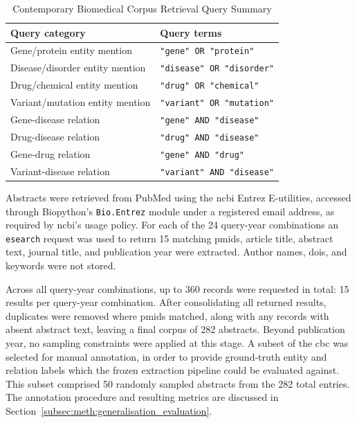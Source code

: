 \begin{table}[H]
    \centering
    \caption{Contemporary Biomedical Corpus Retrieval Query Summary}
    \label{tab:contemporary_corpus_query_summary}
    \begin{tabularx}{\textwidth}{l l}
        \toprule
        Query category & Query terms \\
        \midrule
        Gene/protein entity mention & \verb|"gene" OR "protein"| \\
        Disease/disorder entity mention & \verb|"disease" OR "disorder"| \\
        Drug/chemical entity mention & \verb|"drug" OR "chemical"| \\
        Variant/mutation entity mention & \verb|"variant" OR "mutation"| \\
        Gene-disease relation & \verb|"gene" AND "disease"| \\
        Drug-disease relation & \verb|"drug" AND "disease"| \\
        Gene-drug relation & \verb|"gene" AND "drug"| \\
        Variant-disease relation & \verb|"variant" AND "disease"| \\
        \bottomrule
    \end{tabularx}
\end{table}

Abstracts were retrieved from PubMed using the \gls{ncbi} Entrez E-utilities, accessed through Biopython's \verb|Bio.Entrez| module under a registered email address, as required by \gls{ncbi}'s usage policy. For each of the 24 query-year combinations an \verb|esearch| request was used to return 15 matching \glspl{pmid}, article title, abstract text, journal title, and publication year were extracted. Author names, \glspl{doi}, and keywords were not stored.

Across all query-year combinations, up to 360 records were requested in total: 15 results per query-year combination. After consolidating all returned results, duplicates were removed where \glspl{pmid} matched, along with any records with absent abstract text, leaving a final corpus of 282 abstracts. Beyond publication year, no sampling constraints were applied at this stage. A subset of the \gls{cbc} was selected for manual annotation, in order to provide ground-truth entity and relation labels which the frozen extraction pipeline could be evaluated against. This subset comprised 50 randomly sampled abstracts from the 282 total entries. The annotation procedure and resulting metrics are discussed in Section~\ref{subsec:meth:generalisation_evaluation}.

